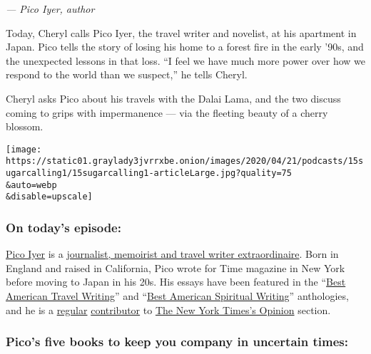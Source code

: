 \emph{--- Pico Iyer, author}

Today, Cheryl calls Pico Iyer, the travel writer and novelist, at his
apartment in Japan. Pico tells the story of losing his home to a forest
fire in the early '90s, and the unexpected lessons in that loss. ``I
feel we have much more power over how we respond to the world than we
suspect,'' he tells Cheryl.

Cheryl asks Pico about his travels with the Dalai Lama, and the two
discuss coming to grips with impermanence --- via the fleeting beauty of
a cherry blossom.

\texttt{[image: https://static01.graylady3jvrrxbe.onion/images/2020/04/21/podcasts/15sugarcalling1/15sugarcalling1-articleLarge.jpg?quality=75\\\&auto=webp\\\&disable=upscale]}

\hypertarget{on-todays-episode}{%
\subsubsection{\texorpdfstring{\textbf{On today's
episode:}}{On today's episode:}}\label{on-todays-episode}}

\href{https://picoiyerjourneys.com/}{Pico Iyer} is a
\href{https://www.nytimes3xbfgragh.onion/2019/04/22/books/review/pico-iyer-autumn-light-memoir-japan.html}{journalist,
memoirist and travel writer extraordinaire}. Born in England and raised
in California, Pico wrote for Time magazine in New York before moving to
Japan in his 20s. His essays have been featured in the
``\href{https://www.amazon.com/Best-American-Travel-Writing-2004/dp/0618341269}{Best
American Travel Writing}'' and
``\href{https://www.amazon.com/dp/B0036Q4M7W/ref=dp-kindle-redirect?_encoding=UTF8\&btkr=1}{Best
American Spiritual Writing}'' anthologies, and he is a
\href{https://www.nytimes3xbfgragh.onion/2019/09/20/opinion/aging-marriage-autumn.html}{regular}
\href{https://www.nytimes3xbfgragh.onion/2012/01/01/opinion/sunday/the-joy-of-quiet.html}{contributor}
to
\href{https://www.nytimes3xbfgragh.onion/2016/12/31/opinion/sunday/what-do-we-know.html}{The
New York Times's Opinion} section.

\hypertarget{picos-five-books-to-keep-you-company-in-uncertain-times}{%
\subsubsection{\texorpdfstring{\textbf{Pico's five books to keep you
company in uncertain
times:}}{Pico's five books to keep you company in uncertain times:}}\label{picos-five-books-to-keep-you-company-in-uncertain-times}}

